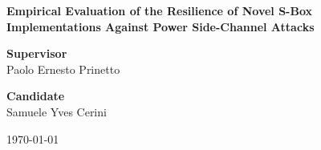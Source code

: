 \begin{center}
    \huge\bfseries{Empirical Evaluation of the Resilience of Novel S-Box Implementations Against Power Side-Channel Attacks}\par

    \bigskip
    \bigskip
    \bigskip

    \normalsize
    
    \Large\begin{minipage}{2in}
        \begin{flushleft}
            \textbf{Supervisor} \\
            \textnormal{Paolo Ernesto Prinetto}
        \end{flushleft}
    \end{minipage}
        \hfill
    \Large\begin{minipage}{2in}
        \begin{flushright}
            \textbf{Candidate} \\
            \textnormal{Samuele Yves Cerini}
        \end{flushright}
    \end{minipage}

    \bigskip
    \bigskip
    \bigskip
    
    \Large\textnormal{\today}
    
    \bigskip
    \bigskip
    \bigskip

    \normalsize

\end{center}